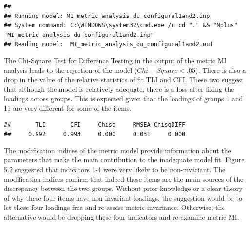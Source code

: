 \documentclass[]{book}
\newenvironment{Shaded}{\begin{snugshade}}{\end{snugshade}}
\newcommand{\DataTypeTok}[1]{\textcolor[rgb]{0.13,0.29,0.53}{#1}}
\newcommand{\KeywordTok}[1]{\textcolor[rgb]{0.13,0.29,0.53}{\textbf{#1}}}
\newcommand{\NormalTok}[1]{#1}
\newcommand{\OperatorTok}[1]{\textcolor[rgb]{0.81,0.36,0.00}{\textbf{#1}}}
\begin{document}
\begin{verbatim}
## 
## Running model: MI_metric_analysis_du_configural1and2.inp 
## System command: C:\WINDOWS\system32\cmd.exe /c cd "." && "Mplus" "MI_metric_analysis_du_configural1and2.inp" 
## Reading model:  MI_metric_analysis_du_configural1and2.out
\end{verbatim}

The Chi-Square Test for Difference Testing in the output of the metric MI analysis leads to the rejection of the model (\(Chi-Square<.05\)). There is also a drop in the value of the relative statistics of fit TLI and CFI. These two suggest that although the model is relatively adequate, there is a loss after fixing the loadings across groups. This is expected given that the loadings of groups 1 and 11 are very different for some of the items.

\begin{Shaded}
\end{Shaded}

\begin{verbatim}
##       TLI       CFI     Chisq     RMSEA ChisqDIFF 
##     0.992     0.993     0.000     0.031     0.000
\end{verbatim}

The modification indices of the metric model provide information about the parameters that make the main contribution to the inadequate model fit. Figure 5.2 suggested that indicators 1-4 were very likely to be non-invariant. The modification indices confirm that indeed these items are the main sources of the discrepancy between the two groups. Without prior knowledge or a clear theory of why these four items have non-invariant loadings, the suggestion would be to let these four loadings free and re-assess metric invariance. Otherwise, the alternative would be dropping these four indicators and re-examine metric MI.
\end{document}
